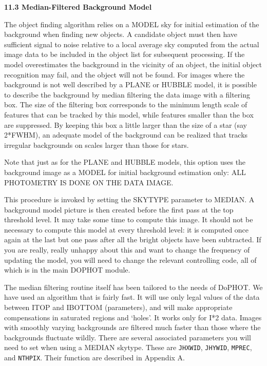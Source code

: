 \centerline {\bf 11.3   Median-Filtered Background Model }
  
The object finding algorithm relies on a MODEL sky for initial 
estimation of the background when finding new objects. A candidate
object must then have sufficient signal to noise relative to a local 
average sky computed from the actual image data to be included in the 
object list for subsequent processing. If the model overestimates the 
background in the vicinity of an object, the initial object recognition
may fail, and the object will not be found. For images where the
background is not well described by a PLANE or HUBBLE model, 
it is possible to describe the background by median filtering the data 
image with a filtering box. The size of the filtering box corresponds
to the minimum length scale of features that can be tracked by this 
model, while features smaller than the box are suppressed. By keeping 
this box a little larger than the size of a star (say 2*FWHM), an 
adequate model of the background can be realized that tracks irregular 
backgrounds on scales larger than those for stars.

Note that just as for the PLANE and HUBBLE models, this option 
uses the background image as a MODEL for initial background estimation 
only:   ALL PHOTOMETRY IS DONE ON THE DATA IMAGE.

This procedure is invoked by setting the SKYTYPE parameter to 
MEDIAN. A background model picture is then created before the first pass
at the top threshold level. It may take some time to compute this image.
It should not be necessary to compute this model at every threshold
level: it is computed once again at the last but one pass after all the
bright objects have been subtracted. If you are really, really unhappy 
about this and want to change the frequency of updating the model, 
you will need to change the relevant controlling code, all of which is 
in the main DOPHOT module.

The median filtering routine itself has been tailored to the needs
of DoPHOT. We have used an algorithm that is fairly fast. It will use 
only legal values of the data between ITOP and IBOTTOM (parameters), and
will make appropriate compensations in saturated regions and `holes'.
It works only for I*2 data. Images with smoothly varying backgrounds are 
filtered much faster than those where the backgrounds fluctuate wildly.
There are several associated parameters you will need to set when
using a MEDIAN skytype.  These are {\tt JHXWID}, {\tt JHYWID}, {\tt MPREC},
and {\tt NTHPIX}.  Their function are described in Appendix A.

